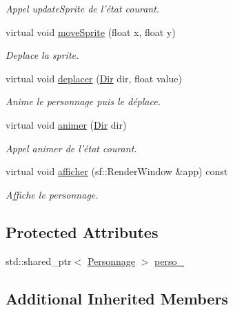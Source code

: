 \begin{DoxyCompactItemize}
\begin{DoxyCompactList}\small\item\em Appel update\-Sprite de l'état courant. \end{DoxyCompactList}\item 
virtual void \hyperlink{classDecorateurPersonnage_ab2374c1fac0a6885289157f4d21fbce8}{move\-Sprite} (float x, float y)
\begin{DoxyCompactList}\small\item\em Deplace la sprite. \end{DoxyCompactList}\item 
virtual void \hyperlink{classDecorateurPersonnage_ae672631729cf24d34aa3b21f52dc0629}{deplacer} (\hyperlink{Espace_8h_a7cf6e8c5a5bc5e7b2afef3647870b1c4}{Dir} dir, float value)
\begin{DoxyCompactList}\small\item\em Anime le personnage puis le déplace. \end{DoxyCompactList}\item 
virtual void \hyperlink{classDecorateurPersonnage_aa6603228e137ce603a4f8602fec0bb8b}{animer} (\hyperlink{Espace_8h_a7cf6e8c5a5bc5e7b2afef3647870b1c4}{Dir} dir)
\begin{DoxyCompactList}\small\item\em Appel animer de l'état courant. \end{DoxyCompactList}\item 
virtual void \hyperlink{classDecorateurPersonnage_ae0a0f67b65ca9709974350c69c5b4739}{afficher} (sf\-::\-Render\-Window \&app) const 
\begin{DoxyCompactList}\small\item\em Affiche le personnage. \end{DoxyCompactList}\end{DoxyCompactItemize}
\subsection*{Protected Attributes}
\begin{DoxyCompactItemize}
\item 
std\-::shared\-\_\-ptr$<$ \hyperlink{classPersonnage}{Personnage} $>$ \hyperlink{classDecorateurPersonnage_a93da49f9f489f75104d3c9766b36e1f5}{perso\-\_\-}
\end{DoxyCompactItemize}
\subsection*{Additional Inherited Members}


